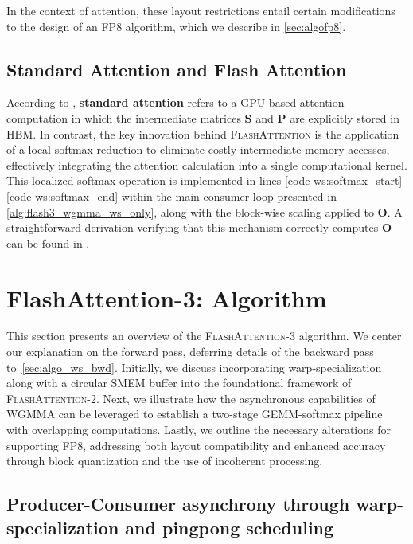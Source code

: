 In the context of attention, these layout restrictions entail certain modifications to the design of an FP8 algorithm, which we describe in \cref{sec:algofp8}.

\subsection{Standard Attention and Flash Attention}

According to \citet{dao2022flashattention}, \textbf{standard attention} refers to a GPU-based attention computation in which the intermediate matrices $\mathbf{S}$ and $\mathbf{P}$ are explicitly stored in HBM. In contrast, the key innovation behind \textsc{FlashAttention} is the application of a local softmax reduction to eliminate costly intermediate memory accesses, effectively integrating the attention calculation into a single computational kernel. This localized softmax operation is implemented in lines \ref{code-ws:softmax_start}-\ref{code-ws:softmax_end} within the main consumer loop presented in \cref{alg:flash3_wgmma_ws_only}, along with the block-wise scaling applied to $\mathbf{O}$. A straightforward derivation verifying that this mechanism correctly computes $\mathbf{O}$ can be found in \cite[\S 2.3.1]{dao2023flashattention2}.

\section{FlashAttention-3: Algorithm}
\label{sec:algo}

This section presents an overview of the \textsc{FlashAttention-3} algorithm. We center our explanation on the forward pass, deferring details of the backward pass to~\cref{sec:algo_ws_bwd}. Initially, we discuss incorporating warp-specialization along with a circular SMEM buffer into the foundational framework of \textsc{FlashAttention-2}. Next, we illustrate how the asynchronous capabilities of WGMMA can be leveraged to establish a two-stage GEMM-softmax pipeline with overlapping computations. Lastly, we outline the necessary alterations for supporting FP8, addressing both layout compatibility and enhanced accuracy through block quantization and the use of incoherent processing.

\subsection{Producer-Consumer asynchrony through warp-specialization and pingpong scheduling}
\label{sec:algo_ws}

